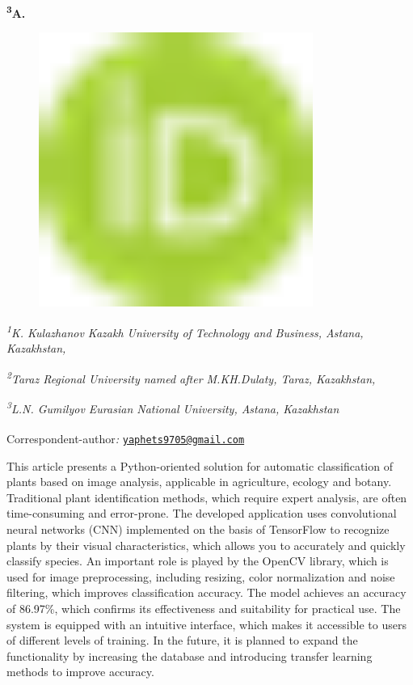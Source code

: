 {{\bfseries \textsuperscript{3}A.
\begin{figure}[H]
	\centering
	\includegraphics[width=0.8\textwidth]{media/ict/image1}
	\caption*{}
\end{figure}


\emph{\textsuperscript{1}K. Kulazhanov Kazakh University of Technology
and Business, Astana, Kazakhstan,}

\emph{\textsuperscript{2}Taraz Regional University named after
M.KH.Dulaty, Taraz, Kazakhstan,}

\emph{\textsuperscript{3}L.N. Gumilyov Eurasian National University,
Astana, Kazakhstan}

{\bfseries \textsuperscript{\envelope }}Correspondent-author\emph{:}
\href{mailto:yaphets9705@gmail.com}{\nolinkurl{yaphets9705@gmail.com}}

This article presents a Python-oriented solution for automatic
classification of plants based on image analysis, applicable in
agriculture, ecology and botany. Traditional plant identification
methods, which require expert analysis, are often time-consuming and
error-prone. The developed application uses convolutional neural
networks (CNN) implemented on the basis of TensorFlow to recognize
plants by their visual characteristics, which allows you to accurately
and quickly classify species. An important role is played by the OpenCV
library, which is used for image preprocessing, including resizing,
color normalization and noise filtering, which improves classification
accuracy. The model achieves an accuracy of 86.97\%, which confirms its
effectiveness and suitability for practical use. The system is equipped
with an intuitive interface, which makes it accessible to users of
different levels of training. In the future, it is planned to expand the
functionality by increasing the database and introducing transfer
learning methods to improve accuracy.

}}
